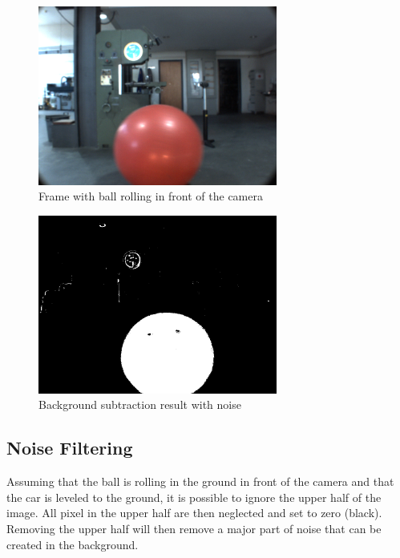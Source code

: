 \begin{figure}[htp]
	
	\centering
	\includegraphics[width=0.7\textwidth]{capcalib/imgs/ball_test.png}
	
	\caption{Frame with ball rolling in front of the camera}
	\label{fig:balltest}
	
\end{figure}


\begin{figure}[htp]
	
	\centering
	\includegraphics[width=0.7\textwidth]{capcalib/imgs/noise.png}
	
	\caption{Background subtraction result with noise}
	\label{fig:ballnoise}
	
\end{figure}

\subsection{Noise Filtering}

Assuming that the ball is rolling in the ground in front of the camera and that the car is leveled to the ground, it is possible to ignore the upper half of the image. All pixel in the upper half are then neglected and set to zero (black). Removing the upper half will then remove a major part of noise that can be created in the background.

